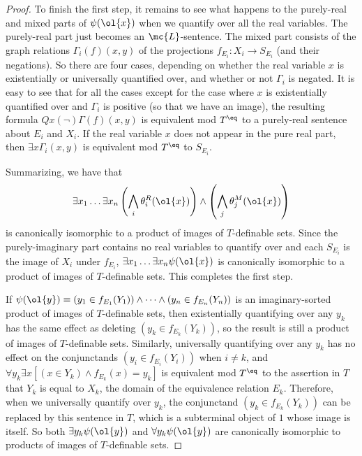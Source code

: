 \documentclass[11pt]{article}
\begin{document}
\begin{proof}
To finish the first step, it remains to see what happens to the purely-real and mixed parts of $\psi(\ol{x})$ when we quantify over all the real variables. The purely-real part just becomes an $\mc{L}$-sentence. The mixed part consists of the graph relations $\Gamma_i(f)(x,y)$ of the projections $f_{E_i} : X_i \to S_{E_i}$ (and their negations). So there are four cases, depending on whether the real variable $x$ is existentially or universally quantified over, and whether or not $\Gamma_i$ is negated. It is easy to see that for all the cases except for the case where $x$ is existentially quantified over and $\Gamma_i$ is positive (so that we have an image), the resulting formula $Qx (\neg)\Gamma(f)(x,y)$ is equivalent mod $T^{\eq}$ to a purely-real sentence about $E_i$ and $X_i$. If the real variable $x$ does not appear in the pure real part, then $\exists x \Gamma_i(x,y)$ is equivalent mod $T^{\eq}$ to $S_{E_i}$.

Summarizing, we have that $$\exists x_1 \dots \exists x_n \left(\bigwedge_i \theta^R_i(\ol{x})\right) \land \left( \bigwedge_j \theta^M_j(\ol{x}) \right)$$ is canonically isomorphic to a product of images of $T$-definable sets. Since the purely-imaginary part contains no real variables to quantify over and each $S_{E_i}$ is the image of $X_i$ under $f_{E_i}$, $\exists x_1 \dots \exists x_n \psi(\ol{x})$ is canonically isomorphic to a product of images of $T$-definable sets. This completes the first step.

If $\psi(\ol{y}) \equiv (y_1 \in f_{E_1}(Y_1)) \land \dots \land (y_n \in f_{E_n}(Y_n))$ is an imaginary-sorted product of images of $T$-definable sets, then existentially quantifying over any $y_k$ has the same effect as deleting $(y_k \in f_{E_k}(Y_k))$, so the result is still a product of images of $T$-definable sets. Similarly, universally quantifying over any $y_k$ has no effect on the conjunctands $(y_i \in f_{E_i}(Y_i))$ when $i \neq k$, and $\forall y_k \exists x \left[ (x \in Y_k) \land f_{E_k}(x) = y_k \right]$ is equivalent mod $T^{\eq}$ to the assertion in $T$ that $Y_k$ is equal to $X_k$, the domain of the equivalence relation $E_k$. Therefore, when we universally quantify over $y_k$, the conjunctand $(y_k \in f_{E_k}(Y_k))$ can be replaced by this sentence in $T$, which is a subterminal object of $1$ whose image is itself. So both $\exists y_k \psi(\ol{y})$ and $\forall y_k \psi(\ol{y})$ are canonically isomorphic to products of images of $T$-definable sets.
\end{proof}
\end{document}
